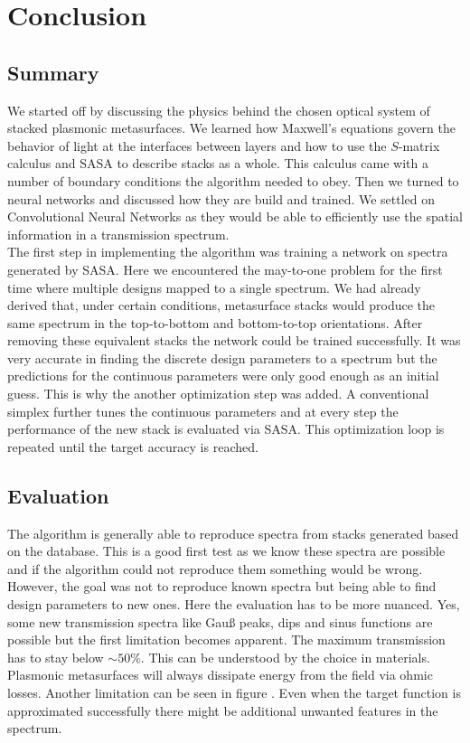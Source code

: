\section{Conclusion} \label{sec:conclusion}

\subsection{Summary}
We started off by discussing the physics behind the chosen optical system of stacked plasmonic metasurfaces. 
We learned how Maxwell's equations govern the behavior of light at the interfaces between layers and how to use the $S$-matrix calculus and SASA to describe stacks as a whole. This calculus came with a number of boundary conditions the algorithm needed to obey. Then we turned to neural networks and discussed how they are build and trained. We settled on Convolutional Neural Networks as they would be able to efficiently use the spatial information in a transmission spectrum.
\\

\indent
The first step in implementing the algorithm was training a network on spectra generated by SASA. Here we encountered the may-to-one problem for the first time where multiple designs mapped to a single spectrum. We had already derived that, under certain conditions, metasurface stacks would produce the same spectrum in the top-to-bottom and bottom-to-top orientations. After removing these equivalent stacks the network could be trained successfully. It was very accurate in finding the discrete design parameters to a spectrum but the predictions for the continuous parameters were only good enough as an initial guess.
This is why the another optimization step was added. A conventional simplex further tunes the continuous parameters and at every step the performance of the new stack is evaluated via SASA. This optimization loop is repeated until the target accuracy is reached.


\subsection{Evaluation} \label{sec:eval}
The algorithm is generally able to reproduce spectra from stacks generated based on the database. 
This is a good first test as we know these spectra are possible and if the algorithm could not reproduce them something would be wrong. However, the goal was not to reproduce known spectra but being able to find design parameters to new ones. Here the evaluation has to be more nuanced. Yes, some new transmission spectra like Gauß peaks, dips and sinus functions are possible but the first limitation becomes apparent.
The maximum transmission has to stay below $\sim 50\%$. This can be understood by the choice in materials. Plasmonic metasurfaces will always dissipate energy from the field via ohmic losses. Another limitation can be seen in figure . Even when the target function is approximated successfully there might be additional unwanted features in the spectrum. 
\\

